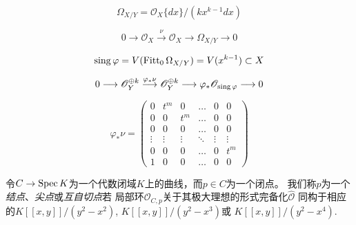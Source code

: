 \[
    \Omega_{X / Y}=\mathscr{O}_X\{d x\} /\left(k x^{k-1} d x\right)
\]

\[
    0 \longrightarrow \mathscr{O}_X \stackrel{\nu}{\longrightarrow} \mathscr{O}_X \longrightarrow \Omega_{X / Y} \longrightarrow 0
\]

\[
    \operatorname{sing}\varphi=V(\operatorname{Fitt}_0 \Omega_{X/Y})=V(x^{k-1})\subset X
\]

\[
    0 \longrightarrow \mathscr{O}_Y^{\oplus k} \stackrel{\varphi_* \nu}{\longrightarrow} \mathscr{O}_Y^{\oplus k} \longrightarrow \varphi_* \mathscr{O}_{\operatorname{sing} \varphi} \longrightarrow 0
\]


\[
    \varphi_* \nu=\begin{pmatrix}
        0 & t^m & 0 & \ldots & 0 & 0 \\
        0 & 0 & t^m & \ldots & 0 & 0 \\
        0 & 0 & 0 & \ldots & 0 & 0 \\
        \vdots & \vdots & \vdots & \ddots & \vdots & \vdots \\
        0 & 0 & 0 & \ldots & 0 & t^m \\
        1 & 0 & 0 & \ldots & 0 & 0
    \end{pmatrix}
\]


\begin{defi}\label{defi:5.31}
    令$C\to \operatorname{Spec} K$为一个代数闭域$K$上的曲线，而$p\in C$为一个闭点。
    我们称$p$为一个\textit{结点}、\textit{尖点}或\textit{互自切点}若
    局部环$\mathscr O_{C,p}$关于其极大理想的形式完备化$\hat{\mathscr O}$
    同构于相应的$K[\![x,y]\!]/(y^2-x^2)$, $K[\![x,y]\!]/(y^2-x^3)$或
    $K[\![x,y]\!]/(y^2-x^4)$.
\end{defi}